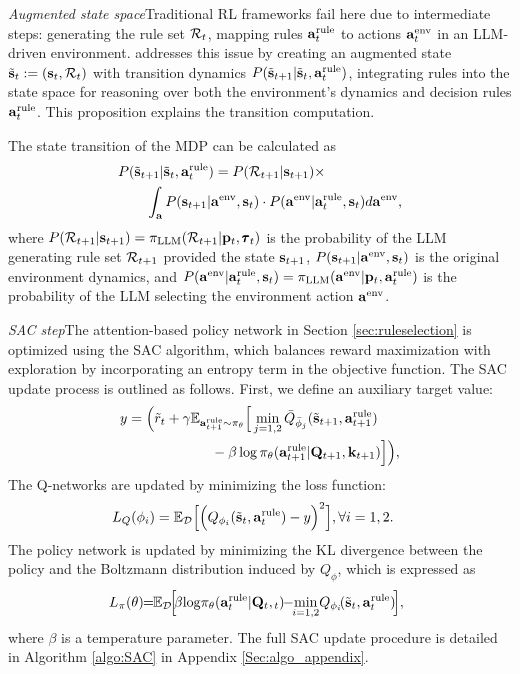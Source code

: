 \emph{Augmented state space}\quad Traditional RL frameworks fail here due to intermediate steps: generating the rule set \({\mathcal{R}}_t\), mapping rules \({\mathbf{a}}^{\text{rule}}_t\) to actions \({\mathbf{a}}^{\text{env}}_t\) in an LLM-driven environment. \rbrl addresses this issue by creating an augmented state \(\tilde{{\mathbf{s}}}_t := ({\mathbf{s}}_t, {\mathcal{R}}_t)\) with transition dynamics \(P(\tilde{{\mathbf{s}}}_{t+1} | \tilde{{\mathbf{s}}}_t, {\mathbf{a}}^{\text{rule}}_t)\), integrating rules into the state space for reasoning over both the environment's dynamics and decision rules \({\mathbf{a}}^{\text{rule}}_t\). This proposition explains the transition computation.
\begin{theorem}
The state transition of the \rbrl MDP  can be calculated as 
\begin{align}
&P(\tilde{\bs}_{t+1}|\tilde{\bs}_t, \arule_t)=P( \cR_{t+1}|\bs_{t+1})\times\nonumber\allowdisplaybreaks\\ &\qquad\int_\ba P(\bs_{t+1}|\aenv,\bs_t)
    \cdot P(\aenv| \arule_t, \bs_t)d\aenv,
\end{align}
where $P( {\mathcal{R}}_{t+1}|{\mathbf{s}}_{t+1})= \pi_{\textrm{LLM}}({\mathcal{R}}_{t+1} | {\mathbf{p}}_t, \pmb{\tau}_t)$ is the probability of the LLM generating rule set ${\mathcal{R}}_{t+1}$ provided the state ${\mathbf{s}}_{t+1}$, $P({\mathbf{s}}_{t+1}|{\mathbf{a}}^{\text{env}},{\mathbf{s}}_t)$ is the original environment dynamics, and $P({\mathbf{a}}^{\text{env}}| {\mathbf{a}}^{\text{rule}}_t, {\mathbf{s}}_t)=\pi_{\textrm{LLM}}({\mathbf{a}}^{\text{env}} | {\mathbf{p}}_t, {\mathbf{a}}^{\text{rule}}_t)$ is the probability of the LLM selecting the environment action ${\mathbf{a}}^{\text{env}}$.
\label{prop:transition}
\end{theorem}


\emph{SAC step}\quad The attention-based policy network in Section \ref{sec:ruleselection} is optimized using the SAC algorithm, which balances reward maximization with exploration by incorporating an entropy term in the objective function. The SAC update process is outlined as follows.
First, we define an auxiliary target value:
\begin{align}
    y&=\Big( \tilde{r}_t + \gamma \mathbb{E}_{{\mathbf{a}}^{\text{rule}}_{t+1} \sim \pi_\theta} \Big[ \min_{j=1,2} \bar{Q}_{\bar{\phi}_j}(\tilde{{\mathbf{s}}}_{t+1}, {\mathbf{a}}^{\text{rule}}_{t+1})\nonumber\\
    &\qquad\qquad\qquad- \beta \log \pi_\theta({\mathbf{a}}^{\text{rule}}_{t+1}|{\mathbf{Q}}_{t+1}, {\mathbf{k}}_{t+1}) \Big] \Big),
\end{align}
The Q-networks are updated by minimizing the loss function: 
\begin{align}
    L_Q(\phi_i) &= \mathbb{E}_{\mathcal{D}} \Big[ \Big( Q_{\phi_i}(\tilde{{\mathbf{s}}}_t, {\mathbf{a}}^{\text{rule}}_t) -y \Big)^2 \Big], \forall i=1,2.
\end{align}
The policy network is updated by minimizing the KL divergence between the policy and the Boltzmann distribution induced by \( Q_\phi \), which is expressed as
    \begin{align}
    \hspace{-0.2cm}
        L_\pi(\theta)\!\!=\!\! \mathbb{E}_{\cD} \!\Big[\! \beta \!\log \!\pi_\theta(\arule_t | \bQ_t, \!\newblock{}_t)\!\! -\! \!\min_{i=1,2}\!Q_{\phi_i}\!(\tilde{\bs}_t, \arule_t) \!\Big],
    \end{align}
where $\beta$ is a temperature parameter.  The full SAC update procedure is detailed in Algorithm \ref{algo:SAC} in Appendix \ref{Sec:algo_appendix}.
         

 